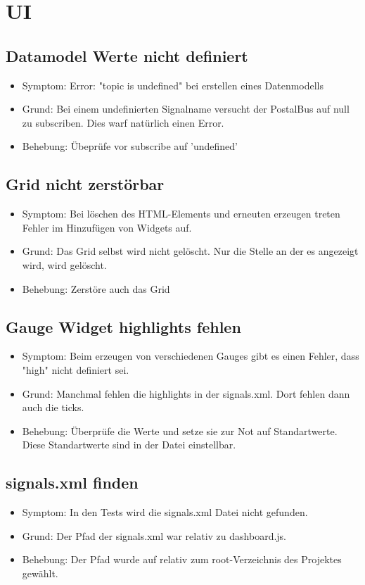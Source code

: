 \documentclass[qualitaetssicherung.tex]{subfiles}
\begin{document}
\section{UI}

	\subsection{Datamodel Werte nicht definiert}
		\begin{itemize}
			\item
			Symptom: Error: "topic is undefined" bei erstellen eines Datenmodells
			\item
			Grund: Bei einem undefinierten Signalname versucht der PostalBus auf null zu subscriben. Dies warf natürlich einen Error.
			\item
			Behebung: Übeprüfe vor subscribe auf 'undefined'
		\end{itemize}
		
	\subsection{Grid nicht zerstörbar}
		\begin{itemize}
			\item
			Symptom: Bei löschen des HTML-Elements und erneuten erzeugen treten Fehler im Hinzufügen von Widgets auf. 
			\item
			Grund: Das Grid selbst wird nicht gelöscht. Nur die Stelle an der es angezeigt wird, wird gelöscht.
			\item
			Behebung: Zerstöre auch das Grid
		\end{itemize}
		
	\subsection{Gauge Widget highlights fehlen}
	\begin{itemize}
		\item
		Symptom: Beim erzeugen von verschiedenen Gauges gibt es einen Fehler, dass "high" nicht definiert sei.
		\item
		Grund: Manchmal fehlen die highlights in der signals.xml. Dort fehlen dann auch die ticks.
		\item
		Behebung: Überprüfe die Werte und setze sie zur Not auf Standartwerte. Diese Standartwerte sind in der Datei einstellbar.
	\end{itemize}	
	
	\subsection{signals.xml finden}
	\begin{itemize}
		\item
		Symptom: In den Tests wird die signals.xml Datei nicht gefunden.
		\item
		Grund: Der Pfad der signals.xml war relativ zu dashboard.js.
		\item
		Behebung: Der Pfad wurde auf relativ zum root-Verzeichnis des Projektes gewählt.
	\end{itemize}	
	
\end{document}
